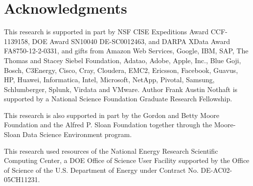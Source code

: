 \documentclass[conference]{IEEEtran}
\begin{document}
\section{Acknowledgments}

This research is supported in part by NSF CISE Expeditions Award CCF-1139158, DOE Award SN10040 DE-SC0012463, and DARPA XData Award FA8750-12-2-0331, and gifts from Amazon Web Services, Google, IBM, SAP, The Thomas and Stacey Siebel Foundation, Adatao, Adobe, Apple, Inc., Blue Goji, Bosch, C3Energy, Cisco, Cray, Cloudera, EMC2, Ericsson, Facebook, Guavus, HP, Huawei, Informatica, Intel, Microsoft, NetApp, Pivotal, Samsung, Schlumberger, Splunk, Virdata and VMware. Author Frank Austin Nothaft is supported by a National Science Foundation Graduate Research Fellowship.

This research is also supported in part by the Gordon and Betty Moore
Foundation and the Alfred P. Sloan Foundation together through the
Moore-Sloan Data Science Environment program.

This research used resources of the National Energy Research Scientific Computing Center, a DOE Office of Science User Facility supported by the Office of Science of the U.S. Department of Energy under Contract No. DE-AC02-05CH11231.

\balance
 
\end{document}
